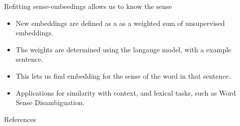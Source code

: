 \documentclass[dvipsnames]{beamer}
\begin{document}
\begin{frame}{Refitting sense-embeedings allows us to know the sense}
	\vfill
	\begin{itemize}
		\item New embeddings are defined as a as a \alert{weighted sum} of unsupervised embeddings.
		\item The \alert{weights} are determined using the \alert{langauge model}, with a  \alert{example sentence}.
		\item This lets us find embedding for the sense of the word in \alert{that sentence}.
		
		\item<2-> Applications for \alert{similarity with context}, and lexical tasks, such as \alert{Word Sense Disambiguation}.
	\end{itemize}
	\vfill
	\sentexample
\end{frame}

\renewcommand*{\bibfont}{\scriptsize}
\begin{frame}{References}
	\tiny
	\printbibliography
\end{frame}
	
\end{document}
